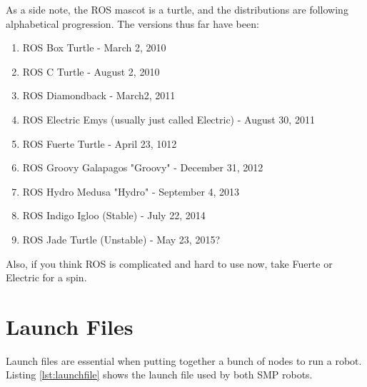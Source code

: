 As a side note, the ROS mascot is a turtle, and the distributions are following alphabetical progression. The versions thus far have been:

\begin{enumerate}
\item{ROS Box Turtle - March 2, 2010}
\item{ROS C Turtle - August 2, 2010}
\item{ROS Diamondback - March2, 2011}
\item{ROS Electric Emys (usually just called Electric) - August 30, 2011}
\item{ROS Fuerte Turtle - April 23, 1012}
\item{ROS Groovy Galapagos "Groovy" - December 31, 2012}
\item{ROS Hydro Medusa "Hydro" - September 4, 2013}
\item{ROS Indigo Igloo (Stable) - July 22, 2014}
\item{ROS Jade Turtle (Unstable) - May 23, 2015?}
\end{enumerate}

Also, if you think ROS is complicated and hard to use now, take Fuerte or Electric for a spin.

\section{Launch Files}
\label{sec:launchfiles}

Launch files are essential when putting together a bunch of nodes to run a robot. Listing \ref{lst:launchfile} shows the launch file used by both SMP robots.

